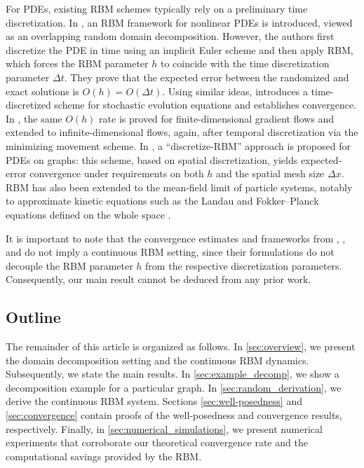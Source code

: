 \documentclass[a4paper, 10pt, english]{article}
\begin{document}
For PDEs, existing RBM schemes typically rely on a preliminary time discretization. In \cite{eisenmann2022randomized}, an RBM framework for nonlinear PDEs is introduced, viewed as an overlapping random domain decomposition. However, the authors first discretize the PDE in time using an implicit Euler scheme and then apply RBM, which forces the RBM parameter $h$ to coincide with the time discretization parameter $\Delta t$. They prove that the expected error between the randomized and exact solutions is $O(h)=O(\Delta t)$. Using similar ideas, \cite{MR4828491} introduces a time-discretized scheme for stochastic evolution equations and establishes convergence. In \cite{Corella_hernandez2025}, the same $O(h)$ rate is proved for finite-dimensional gradient flows and extended to infinite-dimensional flows, again, after temporal discretization via the minimizing movement scheme. In \cite{firstpaper}, a “discretize-RBM” approach is proposed for PDEs on graphs: this scheme, based on spatial discretization, yields expected‐error convergence under requirements on both $h$ and the spatial mesh size $\Delta x$. RBM has also been extended to the mean‐field limit of particle systems, notably to approximate kinetic equations such as the Landau and Fokker–Planck equations defined on the whole space \cite{MR4361973,MR4436794,MR4744252}.

It is important to note that the convergence estimates and frameworks from \cite{eisenmann2022randomized}, \cite{Corella_hernandez2025}, and \cite{firstpaper} do not imply a continuous RBM setting, since their formulations do not decouple the RBM parameter $h$ from the respective discretization parameters. Consequently, our main result cannot be deduced from any prior work.



\subsection{Outline}

The remainder of this article is organized as follows.  In \cref{sec:overview}, we present the domain decomposition setting and the continuous RBM dynamics. Subsequently, we state the main results.  In \cref{sec:example_decomp}, we show a decomposition example for a particular graph. In \cref{sec:random_derivation}, we derive the continuous RBM system. Sections \ref{sec:well-posedness} and \ref{sec:convergence} contain proofs of the well‐posedness and convergence results, respectively. Finally, in \cref{sec:numerical_simulations}, we present numerical experiments that corroborate our theoretical convergence rate and the computational savings provided by the RBM.
 
\end{document}
